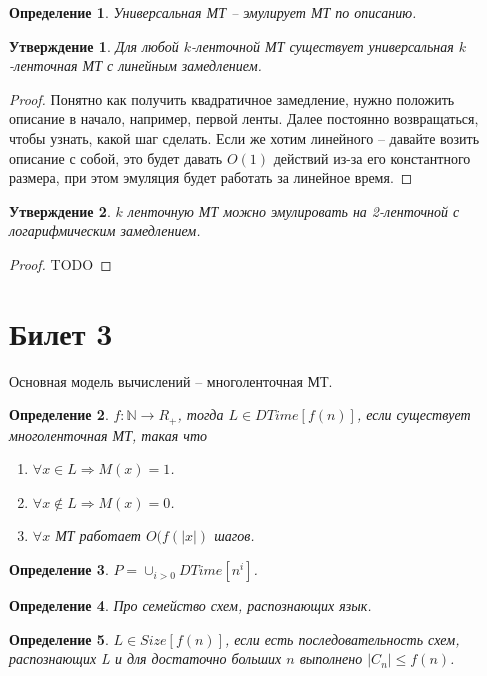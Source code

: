 \documentclass[12pt, letterpaper]{article}
\newtheorem{prop}{Утверждение}[section]
\newtheorem{defi}{Определение}[section]
\begin{document}
\begin{defi}
Универсальная МТ -- эмулирует МТ по описанию.
\end{defi}

\begin{prop}
Для любой $k$-ленточной МТ существует универсальная $k$-ленточная МТ с линейным замедлением.
\end{prop}
\begin{proof}
Понятно как получить квадратичное замедление, нужно положить описание в начало, например, первой ленты. Далее постоянно возвращаться, чтобы узнать, какой шаг сделать. Если же хотим линейного -- давайте возить описание с собой, это будет давать $O(1)$ действий из-за его константного размера, при этом эмуляция будет работать за линейное время.
\end{proof}

\begin{prop}
$k$ ленточную МТ можно эмулировать на 2-ленточной с логарифмическим замедлением.
\end{prop}
\begin{proof}
TODO
\end{proof}


\section{Билет 3}
Основная модель вычислений -- многоленточная МТ. 
\begin{defi}
$f : \mathbb{N} \rightarrow R_{+}$, тогда $L \in DTime[f(n)]$, если 
существует многоленточная МТ, такая что
\begin{enumerate}
\item $\forall x \in L \Rightarrow M(x) = 1$.
\item $\forall x \notin L \Rightarrow M(x) = 0$.
\item $\forall x$ МТ работает $O(f(|x|)$ шагов.
\end{enumerate} 
\end{defi} 

\begin{defi}
$P = \cup_{i>0} DTime[n^i]$.
\end{defi}

\begin{defi}
Про семейство схем, распознающих язык.
\end{defi}

\begin{defi}
$L \in Size[f(n)]$, если есть последовательность схем, распознающих L и для достаточно больших $n$ выполнено $|C_n| \leq f(n)$.
\end{defi}
\end{document}
